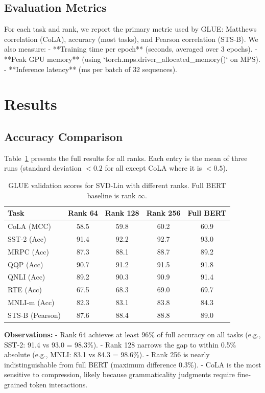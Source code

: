 \documentclass[twocolumn]{article}
\begin{document}
\subsection{Evaluation Metrics}
For each task and rank, we report the primary metric used by GLUE: Matthews correlation (CoLA), accuracy (most tasks), and Pearson correlation (STS-B). We also measure:
- **Training time per epoch** (seconds, averaged over 3 epochs).
- **Peak GPU memory** (using `torch.mps.driver\_allocated\_memory()` on MPS).
- **Inference latency** (ms per batch of 32 sequences).

\section{Results}
\subsection{Accuracy Comparison}
Table~\ref{tab:full_results} presents the full results for all ranks. Each entry is the mean of three runs (standard deviation $<0.2$ for all except CoLA where it is $<0.5$).

\begin{table}[t]
\centering
\caption{GLUE validation scores for SVD-Lin with different ranks. Full BERT baseline is rank $\infty$.}
\label{tab:full_results}
\begin{tabular}{lcccc}
\toprule
\textbf{Task} & \textbf{Rank 64} & \textbf{Rank 128} & \textbf{Rank 256} & \textbf{Full BERT} \\
\midrule
CoLA (MCC)       & 58.5 & 59.8 & 60.2 & 60.9 \\
SST-2 (Acc)      & 91.4 & 92.2 & 92.7 & 93.0 \\
MRPC (Acc)       & 87.3 & 88.1 & 88.7 & 89.2 \\
QQP (Acc)        & 90.7 & 91.2 & 91.5 & 91.8 \\
QNLI (Acc)       & 89.2 & 90.3 & 90.9 & 91.4 \\
RTE (Acc)        & 67.5 & 68.3 & 69.0 & 69.7 \\
MNLI-m (Acc)     & 82.3 & 83.1 & 83.8 & 84.3 \\
STS-B (Pearson)  & 87.6 & 88.4 & 88.8 & 89.0 \\
\bottomrule
\end{tabular}
\end{table}

\textbf{Observations:}
- Rank 64 achieves at least 96\% of full accuracy on all tasks (e.g., SST-2: 91.4 vs 93.0 = 98.3\%).
- Rank 128 narrows the gap to within 0.5\% absolute (e.g., MNLI: 83.1 vs 84.3 = 98.6\%).
- Rank 256 is nearly indistinguishable from full BERT (maximum difference 0.3\%).
- CoLA is the most sensitive to compression, likely because grammaticality judgments require fine-grained token interactions.
\end{document}
